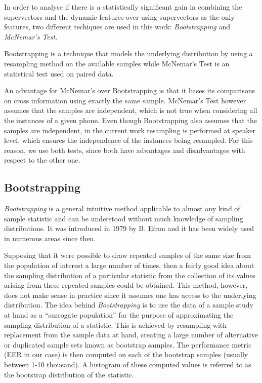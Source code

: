 In order to analyse if
there is a statistically significant gain in combining the
supervectors and the dynamic features
over using supervectors as the only features,
two different techiques are used in this work: \textit{Bootstrapping} and
\textit{McNemar's Test}.

Bootstrapping is a technique that models the underlying
distribution by using a resampling method on the available samples while McNemar's
Test is an statistical test used on paired data.

An advantage for McNemar's
over Bootstrapping is that it bases its comparisons on cross information using
exactly the same sample.
McNemar's Test however assumes that the samples
are independent, which is not true when considering
all the instances of a given phone. Even though Bootstrapping also assumes that
the samples are independent, in the current work resampling is performed
at speaker level, which ensures the independence of the instances being resampled.
For this reason, we use both tests, since both have advantages and
disadvantages with respect to the other one.

\subsection{Bootstrapping} \label{subsection:bootstrapping}

\textit{Bootstrapping} \cite{bootstrapping} is a general intuitive method applicable
to almost any kind of sample statistic and can be understood without much
knowledge of sampling distributions. It was introduced in 1979 by B. Efron and it has
been widely used in numerous areas since then.

Supposing that it were possible to draw repeated samples
of the same size from the population of interest a large number of times, then
a fairly good idea about the sampling distribution of a particular statistic from
the collection of its values arising from these repeated samples could be obtained.
This method, however, does not make sense in practice since it assumes one has access to the
underlying distribution.
The idea behind \textit{Bootstrapping} is to use the data of a sample study at hand as a
``surrogate population'' for the purpose of approximating the sampling distribution of
a statistic. This is achieved by resampling with replacement from the sample data
at hand, creating a large number of alternative or duplicated sample sets known as
bootstrap samples. The performance metric (EER in our case)
is then computed on each of the bootstrap
samples (usually between 1-10 thousand). A histogram of these computed
values is referred to as the bootstrap distribution of the statistic.

